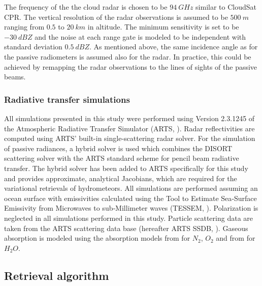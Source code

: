 \documentclass[journal abbreviation, manuscript]{copernicus}
\begin{document}
The frequency of the the cloud radar is chosen to be $94\ \unit{GHz}$ similar to
CloudSat CPR. The vertical resolution of the radar observations is assumed to be
$500\ \unit{m}$ ranging from $0.5$ to $20\ \unit{km}$ in altitude. The minimum
sensitivity is set to be $-30\ \unit{dBZ}$ and the noise at each range gate is
modeled to be independent with standard deviation $0.5\ \unit{dBZ}$. As mentioned
above, the same incidence angle as for the passive radiometers is assumed also
for the radar. In practice, this could be achieved by remapping the radar
observations to the lines of sights of the passive beams.

\subsubsection{Radiative transfer simulations}
\label{sec:orge741b86}

All simulations presented in this study were performed using Version 2.3.1245 of
the Atmospheric Radiative Transfer Simulator (ARTS, \cite{arts18}). Radar
reflectivities are computed using ARTS' built-in single-scattering radar solver.
For the simulation of passive radiances, a hybrid solver is used which combines
the DISORT \citep{disort00} scattering solver with the ARTS standard scheme for
pencil beam radiative transfer. The hybrid solver has been added to ARTS
specifically for this study and provides approximate, analytical Jacobians,
which are required for the variational retrievals of hydrometeors. All
simulations are performed assuming an ocean surface with emissivities calculated
using the Tool to Estimate Sea‐Surface Emissivity from Microwaves to
sub‐Millimeter waves (TESSEM, \cite{prigent16}). Polarization is neglected in
all simulations performed in this study. Particle scattering data are taken from
the ARTS scattering data base (hereafter ARTS SSDB, \citet{eriksson18}). Gaseous
absorption is modeled using the absorption models from \cite{rosenkranz93}
for $N_2$, $O_2$ and from \cite{rosenkranz98}  for $H_2O$.


\subsection{Retrieval algorithm}
\label{sec:orgb528563}
\end{document}
